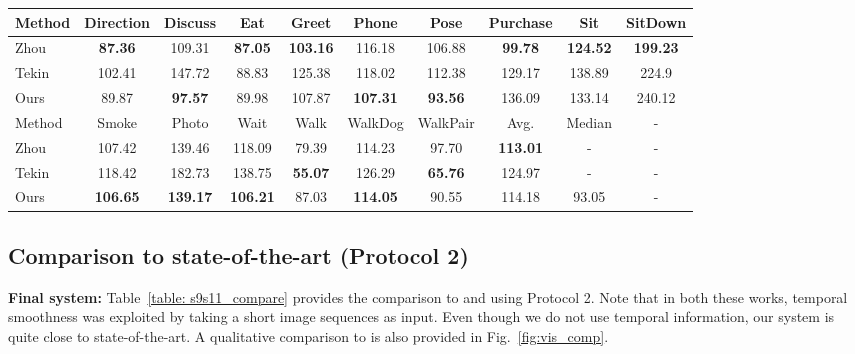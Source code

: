 \documentclass[10pt,twocolumn,letterpaper]{article}
\begin{document}
\begin{table*}[t!]
\centering
\begin{tabular}{|l|c|c|c|c|c|c|c|c|c|}
\hline
Method & Direction & Discuss & Eat & Greet & Phone & Pose & Purchase & Sit & SitDown\\
\hline
\hline
Zhou \cite{Zhou_2016_CVPR}& \textbf{87.36} & 109.31 & \textbf{87.05} & \textbf{103.16} & 116.18 & 106.88 & \textbf{99.78} & \textbf{124.52} & \textbf{199.23} \\
Tekin \cite{Tekin_2016_CVPR}& 102.41 & 147.72 & 88.83 & 125.38 & 118.02 & 112.38 & 129.17 & 138.89 & 224.9 \\
\hline
Ours & 89.87 &\textbf{97.57} &89.98 &107.87 &\textbf{107.31} &\textbf{93.56} &136.09 &133.14 &240.12 \\
\hline
\hline
Method & Smoke & Photo & Wait & Walk & WalkDog & WalkPair & Avg. & Median & -\\
\hline
\hline
Zhou \cite{Zhou_2016_CVPR}& 107.42 & 139.46 & 118.09 & 79.39 & 114.23 & 97.70 & \textbf{113.01} & - &-\\
Tekin \cite{Tekin_2016_CVPR}& 118.42 & 182.73 & 138.75 & \textbf{55.07} & 126.29 & \textbf{65.76} & 124.97 & -&- \\
\hline
Ours & \textbf{106.65} &\textbf{139.17} &\textbf{106.21} &87.03 &\textbf{114.05} &90.55 & 114.18 & 93.05&-\\
\hline

\end{tabular}
\caption{Comparison to \cite{Zhou_2016_CVPR} and \cite{Tekin_2016_CVPR} by \textbf{Protocol 2}. Our results are close to state-of-the-art.}
\label{table: s9s11_compare}
\end{table*}

\subsection{Comparison to state-of-the-art (Protocol 2)}


{\bf Final system:} Table~\ref{table: s9s11_compare} provides the comparison to \cite{Zhou_2016_CVPR} and \cite{Tekin_2016_CVPR} using Protocol 2. Note that in both these works, temporal smoothness was exploited by taking a short image sequences as input. Even though we do not use temporal information, our system is quite close to state-of-the-art. A qualitative comparison to \cite{Zhou_2016_CVPR} is also provided in Fig.~\ref{fig:vis_comp}. 
\end{document}
